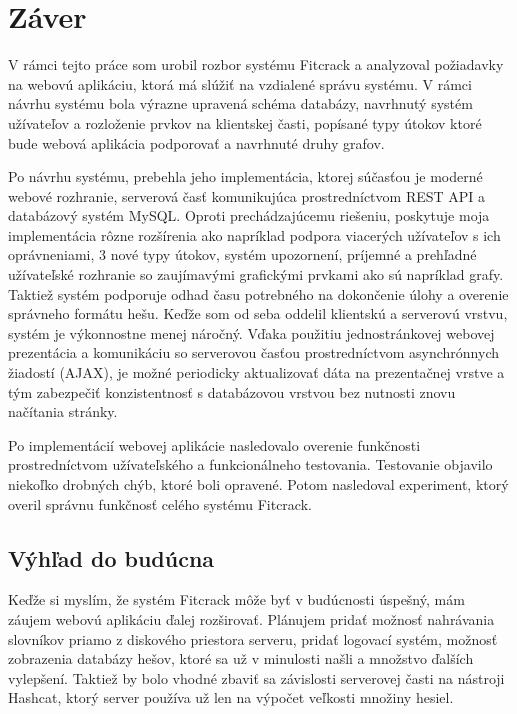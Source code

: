 \documentclass[slovak]{fitthesis}
\begin{document}
\chapter{Záver}\label{zaver}
V rámci tejto práce som urobil rozbor systému Fitcrack a analyzoval požiadavky na webovú aplikáciu, ktorá má slúžiť na vzdialené správu systému. V rámci návrhu systému bola výrazne upravená schéma databázy, navrhnutý systém užívateľov a rozloženie prvkov na klientskej časti, popísané typy útokov ktoré bude webová aplikácia podporovať a navrhnuté druhy grafov.

Po návrhu systému, prebehla jeho implementácia, ktorej súčasťou je moderné webové rozhranie, serverová časť komunikujúca prostredníctvom REST API a databázový systém MySQL. Oproti prechádzajúcemu riešeniu, poskytuje moja implementácia rôzne rozšírenia ako napríklad podpora viacerých užívateľov s ich oprávneniami, 3 nové typy útokov, systém upozornení, príjemné a prehľadné užívateľské rozhranie so zaujímavými grafickými prvkami ako sú napríklad grafy. Taktiež systém podporuje odhad času potrebného na dokončenie úlohy a overenie správneho formátu hešu. Keďže som od seba oddelil klientskú a serverovú vrstvu, systém je výkonnostne menej náročný. Vďaka použitiu jednostránkovej webovej prezentácia a komunikáciu so serverovou časťou prostredníctvom asynchrónnych žiadostí (AJAX), je možné periodicky aktualizovať dáta na prezentačnej vrstve a tým zabezpečiť konzistentnosť s databázovou vrstvou bez nutnosti znovu načítania stránky.

Po implementácií webovej aplikácie nasledovalo overenie funkčnosti prostredníctvom užívateľského a funkcionálneho testovania. Testovanie objavilo niekoľko drobných chýb, ktoré boli opravené. Potom nasledoval experiment, ktorý overil správnu funkčnosť celého systému Fitcrack.


\section{Výhľad do budúcna}
Keďže si myslím, že systém Fitcrack môže byť v budúcnosti úspešný, mám záujem webovú aplikáciu ďalej rozširovať. Plánujem pridať možnosť nahrávania slovníkov priamo z diskového priestora serveru, pridať logovací systém, možnosť zobrazenia databázy hešov, ktoré sa už v minulosti našli a množstvo ďalších vylepšení. Taktiež by bolo vhodné zbaviť sa závislosti serverovej časti na nástroji Hashcat, ktorý server používa už len na výpočet veľkosti množiny hesiel.
\end{document}
